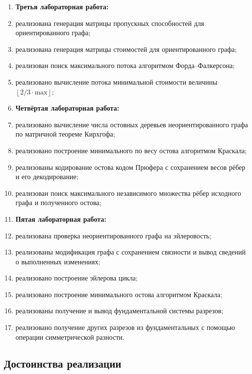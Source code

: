 \begin{enumerate}
    \vspace{1em}
    \item[] \textbf{Третья лабораторная работа:}
    \item реализована генерация матрицы пропускных способностей для ориентированного графа;
    \item реализована генерация матрицы стоимостей для ориентированного графа;
    \item реализован поиск максимального потока алгоритмом Форда--Фалкерсона;
    \item реализовано вычисление потока минимальной стоимости величины $\left\lfloor 2 / 3 \cdot \text{max} \right\rfloor$;

    \vspace{1em}
    \item[] \textbf{Четвёртая лабораторная работа:}
    \item реализовано вычисление числа остовных деревьев неориентированного графа по матричной теореме Кирхгофа;
    \item реализовано построение минимального по весу остова алгоритмом Краскала;
    \item реализованы кодирование остова кодом Прюфера с сохранением весов рёбер и его декодирование;
    \item реализован поиск максимального независимого множества рёбер исходного графа и полученного остова;

    \vspace{1em}
    \item[] \textbf{Пятая лабораторная работа:}
    \item реализована проверка неориентированного графа на эйлеровость;
    \item реализованы модификация графа с сохранением связности и вывод сведений о выполненных изменениях;
    \item реализовано построение эйлерова цикла;
    \item реализовано построение минимального остова алгоритмом Краскала;
    \item реализованы получение и вывод фундаментальной системы разрезов;
    \item реализовано получение других разрезов из фундаментальных с помощью операции симметрической разности.
\end{enumerate}

\subsection*{Достоинства реализации}


